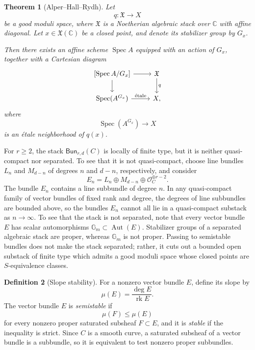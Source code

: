 \documentclass{amsart}
\newtheorem{thm}{Theorem}[section]
\theoremstyle{definition}
\newtheorem{defn}[thm]{Definition}
\theoremstyle{remark}
\theoremstyle{plain}
\theoremstyle{definition}
\theoremstyle{remark}
\newcommand{\G}{\mathbb{G}}
\newcommand{\C}{\mathbb{C}}
\newcommand{\mc}[1]{\mathcal{#1}}
\newcommand{\mf}[1]{\mathfrak{#1}}
\newcommand{\on}[1]{\operatorname{#1}}
\newcommand{\ms}[1]{\mathsf{#1}}
\newcommand{\1}{\mathbf{1}}
\newcommand{\2}{\mathbf{2}}
\newcommand{\3}{\mathbf{3}}
\begin{document}
\begin{thm}[Alper--Hall--Rydh]
    Let
    \[
        q\colon \mf{X}\longrightarrow X
    \]
    be a good moduli space, where \(\mf{X}\) is a Noetherian
    algebraic stack over \(\C\) with affine diagonal.
    Let \(x\in\mf{X}(\C)\) be a closed point, and denote its
    stabilizer group by \(G_x\).

    Then there exists an affine scheme \(\on{Spec}A\) equipped
    with an action of \(G_x\), together with a Cartesian diagram
    \[
        \begin{tikzcd}
            {[\on{Spec}A/G_x]}
                \arrow[r]
                \arrow[d]
            & \mf{X}
                \arrow[d, "q"]
            \\
            \on{Spec}(A^{G_x})
                \arrow[r, "\mathrm{\acute{e}tale}"]
            & X,
        \end{tikzcd}
    \]
    where
    \[
        \on{Spec}(A^{G_x})\longrightarrow X
    \]
    is an \'etale neighborhood of \(q(x)\).
\end{thm}

For \(r\geq 2\), the stack \(\ms{Bun}_{r,d}(C)\) is locally of finite type, but it is neither quasi-compact nor separated. To see that it is not quasi-compact, choose line bundles \(L_n\) and \(M_{d-n}\) of degrees \(n\) and \(d-n\), respectively, and consider
\[
    E_n=L_n\oplus M_{d-n}\oplus\mc{O}_C^{\oplus r-2}.
\]
The bundle \(E_n\) contains a line subbundle of degree \(n\). In any quasi-compact family of vector bundles of fixed rank and degree, the degrees of line subbundles are bounded above, so the bundles \(E_n\) cannot all lie in a quasi-compact substack as \(n\to\infty\). To see that the stack is not separated, note that every vector bundle \(E\) has scalar automorphisms \(\G_m\subset\on{Aut}(E)\). Stabilizer groups of a separated algebraic stack are proper, whereas \(\G_m\) is not proper. Passing to semistable bundles does not make the stack separated; rather, it cuts out a bounded open substack of finite type which admits a good moduli space whose closed points are \(S\)-equivalence classes.

\begin{defn}[Slope stability]
    For a nonzero vector bundle \(E\), define its slope by
    \[ \mu(E)=\frac{\deg E}{\on{rk}E}. \]
    The vector bundle \(E\) is \textit{semistable} if
    \[ \mu(F)\leq\mu(E) \]
    for every nonzero proper saturated subsheaf \(F\subset E\), and it is \textit{stable} if the inequality is strict. Since \(C\) is a smooth curve, a saturated subsheaf of a vector bundle is a subbundle, so it is equivalent to test nonzero proper subbundles.
\end{defn}
\end{document}
